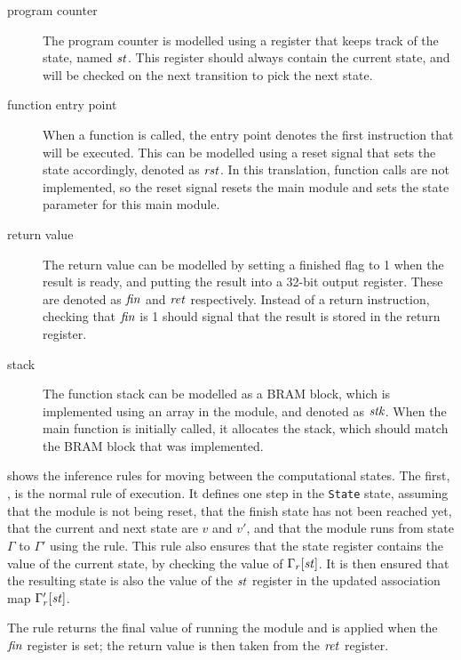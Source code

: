 \begin{description}
\item[program counter] The program counter is modelled using a register that
  keeps track of the state, named $\mathit{st}$.  This register should always
  contain the current state, and will be checked on the next transition to pick
  the next state.
\item[function entry point] When a function is called, the entry point denotes
  the first instruction that will be executed. This can be modelled using a
  reset signal that sets the state accordingly, denoted as $\mathit{rst}$.  In
  this translation, function calls are not implemented, so the reset signal
  resets the main module and sets the state parameter for this main module.
\item[return value] The return value can be modelled by setting a finished flag
  to 1 when the result is ready, and putting the result into a 32-bit output
  register. These are denoted as $\mathit{fin}$ and $\mathit{ret}$ respectively.
  Instead of a return instruction, checking that $\mathit{fin}$ is 1 should
  signal that the result is stored in the return register.
\item[stack] The function stack can be modelled as a \gls{BRAM} block, which is
  implemented using an array in the module, and denoted as $\mathit{stk}$.
  When the main function is initially called, it allocates the stack, which
  should match the \gls{BRAM} block that was implemented.
\end{description}

 shows the inference rules for moving between the
computational states.  The first, , is the normal rule
of execution.  It defines one step in the \texttt{State} state, assuming that
the module is not being reset, that the finish state has not been reached yet,
that the current and next state are $v$ and $v'$, and that the module runs from
state $\Gamma$ to $\Gamma'$ using the  rule.  This rule
also ensures that the state register contains the value of the current state, by
checking the value of $\Gamma_r[\mathit{st}]$.  It is then ensured that the resulting
state is also the value of the $\mathit{st}$ register in the updated association map
$\Gamma'_r[\mathit{st}]$.

The  rule returns the final value of running the
module and is applied when the $\mathit{fin}$ register is set; the return value
is then taken from the $\mathit{ret}$ register.

